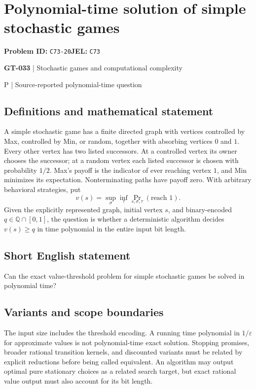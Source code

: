 \documentclass[11pt,a4paper]{article}
\begin{document}
\section*{Polynomial-time solution of simple stochastic games}
\textbf{Problem ID:} \texttt{C73-20}\quad \textbf{JEL:} \texttt{C73}\par
\label{problem:OP-0163}
\label{game:GT-033}
{\sffamily\small\color{muted}
{\sffamily\small\color{muted}\textbf{GT-033} | Stochastic games and computational complexity\par P | Source-reported polynomial-time question\par}
\par}
\subsection*{Definitions and mathematical statement}
A simple stochastic game has a finite directed graph with vertices controlled by Max, controlled by Min, or random, together with absorbing vertices $0$ and $1$. Every other vertex has two listed successors. At a controlled vertex its owner chooses the successor; at a random vertex each listed successor is chosen with probability $1/2$. Max's payoff is the indicator of ever reaching vertex $1$, and Min minimizes its expectation. Nonterminating paths have payoff zero. With arbitrary behavioral strategies, put
\[
 v(s)=\sup_{\sigma}\inf_{\tau}\Pr_{s,\sigma,\tau}(\text{reach }1).
\]
Given the explicitly represented graph, initial vertex $s$, and binary-encoded $q\in\mathbb Q\cap[0,1]$, the question is whether a deterministic algorithm decides $v(s)\geq q$ in time polynomial in the entire input bit length.
\subsection*{Short English statement}
Can the exact value-threshold problem for simple stochastic games be solved in polynomial time?
\subsection*{Variants and scope boundaries}
The input size includes the threshold encoding. A running time polynomial in $1/\varepsilon$ for approximate values is not polynomial-time exact solution. Stopping promises, broader rational transition kernels, and discounted variants must be related by explicit reductions before being called equivalent. An algorithm may output optimal pure stationary choices as a related search target, but exact rational value output must also account for its bit length.
\end{document}
